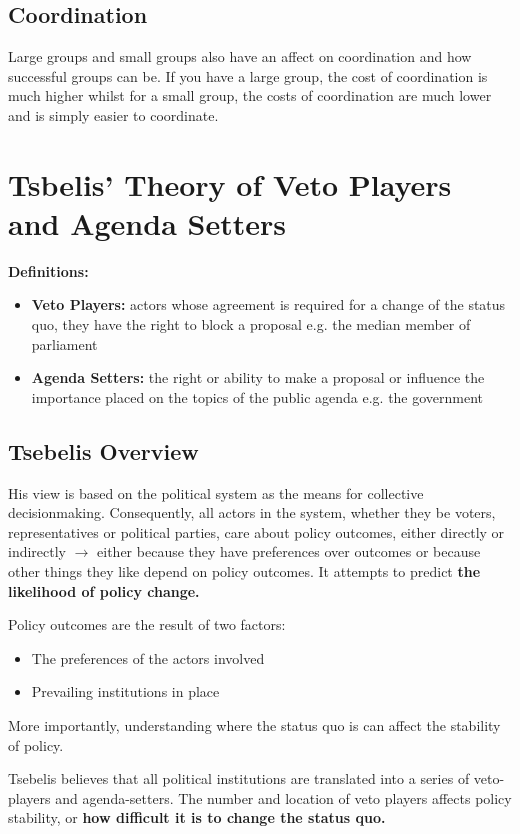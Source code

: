 \documentclass[12pt, letterpaper]{article}
\begin{document}
\subsection{Coordination}
Large groups and small groups also have an affect on coordination and how successful groups can be. If you have a large group, the cost of coordination is much higher whilst for a small group, the costs of coordination are much lower and is simply easier to coordinate.

\newpage
\section{Tsbelis' Theory of Veto Players and Agenda Setters}
\textbf{Definitions:}
\begin{itemize}
	\item \textbf{Veto Players:} actors whose agreement is required for a change of the status quo, they have the right to block a proposal e.g. the median member of parliament
	\item \textbf{Agenda Setters:} the right or ability to make a proposal or influence the importance placed on the topics of the public agenda e.g. the government
\end{itemize}

\subsection{Tsebelis Overview}
His view is based on the political system as the means for collective decisionmaking. Consequently, all actors in the system, whether they be voters, representatives or political parties, care about policy outcomes, either directly or indirectly $\rightarrow$ either because they have preferences over outcomes or because other things they like depend on policy outcomes. It attempts to predict \textbf{the likelihood of policy change.}

Policy outcomes are the result of two factors:
\begin{itemize}
	\item The preferences of the actors involved
	\item Prevailing institutions in place
\end{itemize}
More importantly, understanding where the status quo is can affect the stability of policy.

Tsebelis believes that all political institutions are translated into a series of veto-players and agenda-setters. The number and location of veto players affects policy stability, or \textbf{how difficult it is to change the status quo.}
\end{document}
